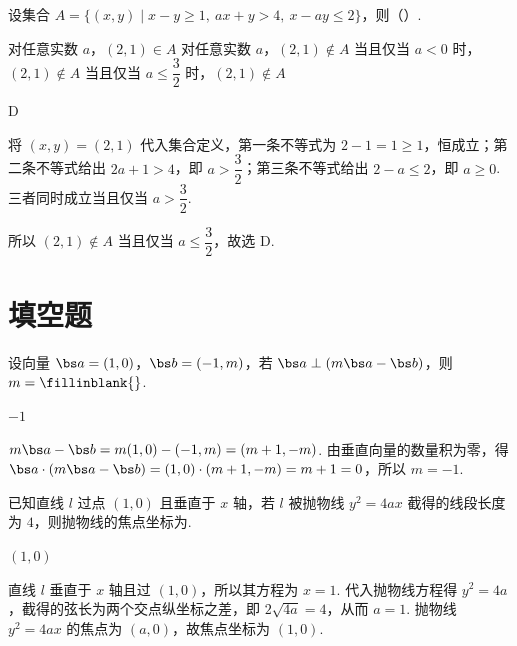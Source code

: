 \begin{problem}
设集合 \(A=\{(x,y)\mid x-y\ge1,\ ax+y>4,\ x-ay\le2\}\)，则（\quad）.

\choices
    {对任意实数 \(a\)，\((2,1)\in A\)}
    {对任意实数 \(a\)，\((2,1)\notin A\)}
    {当且仅当 \(a<0\) 时，\((2,1)\notin A\)}
    {当且仅当 \(a\le\dfrac32\) 时，\((2,1)\notin A\)}
\end{problem}

\begin{answer}
D
\end{answer}

\begin{solution}
将 \((x,y)=(2,1)\) 代入集合定义，第一条不等式为 \(2-1=1\geq1\)，恒成立；第二条不等式给出 \(2a+1>4\)，即 \(a>\dfrac32\)；第三条不等式给出 \(2-a\leq2\)，即 \(a\geq0\). 三者同时成立当且仅当 \(a>\dfrac32\).

所以 \((2,1)\notin A\) 当且仅当 \(a\leq\dfrac32\)，故选 D.
\end{solution}

\section{填空题}

\begin{problem}
设向量 \(\bs a=(1,0)\)，\(\bs b=(-1,m)\)，若 \(\bs a\perp(m\bs a-\bs b)\)，则 \(m=\fillinblank{}\).
\end{problem}

\begin{answer}
\(-1\)
\end{answer}

\begin{solution}
\(m\bs a-\bs b=m(1,0)-(-1,m)=(m+1,-m)\). 由垂直向量的数量积为零，得 \(\bs a\cdot(m\bs a-\bs b)=(1,0)\cdot(m+1,-m)=m+1=0\)，所以 \(m=-1\).
\end{solution}


\begin{problem}
已知直线 \(l\) 过点 \((1,0)\) 且垂直于 \(x\) 轴，若 \(l\) 被抛物线 \(y^2=4ax\) 截得的线段长度为 \(4\)，则抛物线的焦点坐标为\fillinblank{}.
\end{problem}

\begin{answer}
\((1,0)\)
\end{answer}

\begin{solution}
直线 \(l\) 垂直于 \(x\) 轴且过 \((1,0)\)，所以其方程为 \(x=1\). 代入抛物线方程得 \(y^2=4a\)，截得的弦长为两个交点纵坐标之差，即 \(2\sqrt{4a}=4\)，从而 \(a=1\). 抛物线 \(y^2=4ax\) 的焦点为 \((a,0)\)，故焦点坐标为 \((1,0)\).
\end{solution}



